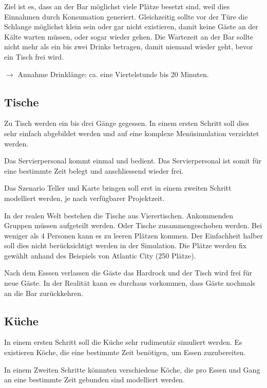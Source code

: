 \documentclass[ngerman,a4paper,12pt]{scrreprt}
\begin{document}
Ziel ist es, dass an der Bar möglichst viele Plätze besetzt sind, weil dies Einnahmen durch Konsumation generiert. Gleichzeitig sollte vor der Türe die Schlange möglichst klein sein oder gar nicht existieren, damit keine Gäste an der Kälte warten müssen, oder sogar wieder gehen. Die Wartezeit an der Bar sollte nicht mehr als ein bis zwei Drinks betragen, damit niemand wieder geht, bevor ein Tisch frei wird.

$\rightarrow$ Annahme Drinklänge: ca. eine Viertelstunde bis 20 Minuten.

\subsection{Tische}
Zu Tisch werden ein bis drei Gänge gegessen. In einem ersten Schritt soll dies sehr einfach abgebildet werden und auf eine komplexe Menüsimulation verzichtet werden.

Das Servierpersonal kommt einmal und bedient. Das Servierpersonal ist somit für eine bestimmte Zeit belegt und anschliessend wieder frei. 

Das Szenario Teller und Karte bringen soll erst in einem zweiten Schritt modelliert werden, je nach verfügbarer Projektzeit.

In der realen Welt bestehen die Tische aus Vierertischen. Ankommenden Gruppen müssen aufgeteilt werden. Oder Tische zusammengeschoben werden. Bei weniger als 4 Personen kann es zu leeren Plätzen kommen. Der Einfachheit halber soll dies nicht berücksichtigt werden in der Simulation.
Die Plätze werden fix gewählt anhand des Beispiels von Atlantic City (250 Plätze).

Nach dem Esssen  verlassen die Gäste das Hardrock und der Tisch wird frei für neue Gäste.
In der Realität kann es durchaus vorkommen, dass Gäste nochmals an die Bar zurückkehren.


\subsection{Küche}
In einem ersten Schritt soll die Küche sehr rudimentär simuliert werden. Es existieren Köche, die eine bestimmte Zeit benötigen, um Essen zuzubereiten. 

In einem Zweiten Schritte könnnten verschiedene Köche, die pro Essen und Gang an eine bestimmte Zeit gebunden sind modelliert werden.
\end{document}
